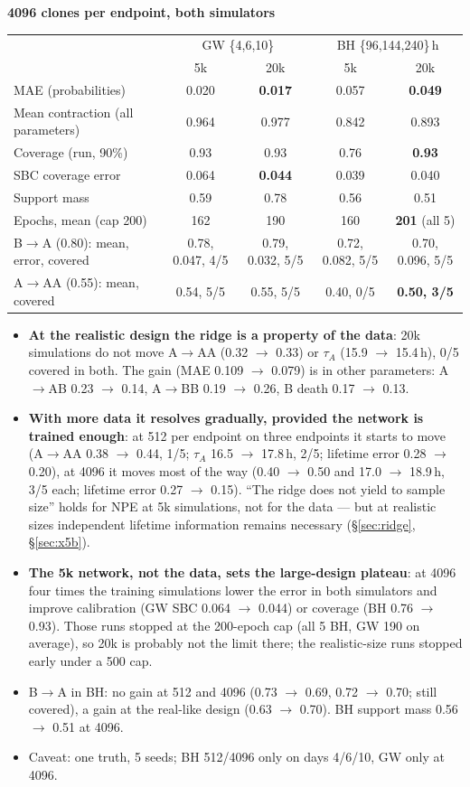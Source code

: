 \documentclass[10pt,a4paper]{article}
\newcommand{\tA}{$\tau_A$}
\newcommand{\blk}[1]{\par\needspace{5\baselineskip}\smallskip{\sffamily\bfseries\color{inkgray}#1}\par}
\newcommand{\Comment}{\blk{Comment}}
\begin{document}
\begin{center}
\medskip\textbf{4096 clones per endpoint, both simulators}\\[2pt]
\setlength{\tabcolsep}{6pt}
\begin{tabular}{@{}lcccc@{}}\toprule
 & \multicolumn{2}{c}{GW \{4,6,10\}} & \multicolumn{2}{c}{BH \{96,144,240\}\,h} \\
 & 5k & 20k & 5k & 20k \\\midrule
MAE (probabilities) & 0.020 & \textbf{0.017} & 0.057 & \textbf{0.049} \\
Mean contraction (all parameters) & 0.964 & 0.977 & 0.842 & 0.893 \\
Coverage (run, 90\%) & 0.93 & 0.93 & 0.76 & \textbf{0.93} \\
SBC coverage error & 0.064 & \textbf{0.044} & 0.039 & 0.040 \\
Support mass & 0.59 & 0.78 & 0.56 & 0.51 \\
Epochs, mean (cap 200) & 162 & 190 & 160 & \textbf{201} (all 5) \\
B$\to$A (0.80): mean, error, covered & 0.78, 0.047, 4/5 & 0.79, 0.032, 5/5 & 0.72, 0.082, 5/5 & 0.70, 0.096, 5/5 \\
A$\to$AA (0.55): mean, covered & 0.54, 5/5 & 0.55, 5/5 & 0.40, 0/5 & \textbf{0.50, 3/5} \\\bottomrule
\end{tabular}
\end{center}
\Comment
\begin{itemize}
\item \textbf{At the realistic design the ridge is a property of the data}: 20k simulations do not move A$\to$AA (0.32 $\to$ 0.33) or \tA{} (15.9 $\to$ 15.4\,h), 0/5 covered in both. The gain (MAE 0.109 $\to$ 0.079) is in other parameters: A$\to$AB 0.23 $\to$ 0.14, A$\to$BB 0.19 $\to$ 0.26, B death 0.17 $\to$ 0.13.
\item \textbf{With more data it resolves gradually, provided the network is trained enough}: at 512 per endpoint on three endpoints it starts to move (A$\to$AA 0.38 $\to$ 0.44, 1/5; \tA{} 16.5 $\to$ 17.8\,h, 2/5; lifetime error 0.28 $\to$ 0.20), at 4096 it moves most of the way (0.40 $\to$ 0.50 and 17.0 $\to$ 18.9\,h, 3/5 each; lifetime error 0.27 $\to$ 0.15). ``The ridge does not yield to sample size'' holds for NPE at 5k simulations, not for the data --- but at realistic sizes independent lifetime information remains necessary (\S\ref{sec:ridge}, \S\ref{sec:x5b}).
\item \textbf{The 5k network, not the data, sets the large-design plateau}: at 4096 four times the training simulations lower the error in both simulators and improve calibration (GW SBC 0.064 $\to$ 0.044) or coverage (BH 0.76 $\to$ 0.93). Those runs stopped at the 200-epoch cap (all 5 BH, GW 190 on average), so 20k is probably not the limit there; the realistic-size runs stopped early under a 500 cap.
\item B$\to$A in BH: no gain at 512 and 4096 (0.73 $\to$ 0.69, 0.72 $\to$ 0.70; still covered), a gain at the real-like design (0.63 $\to$ 0.70). BH support mass 0.56 $\to$ 0.51 at 4096.
\item Caveat: one truth, 5 seeds; BH 512/4096 only on days 4/6/10, GW only at 4096.
\end{itemize}
\end{document}
